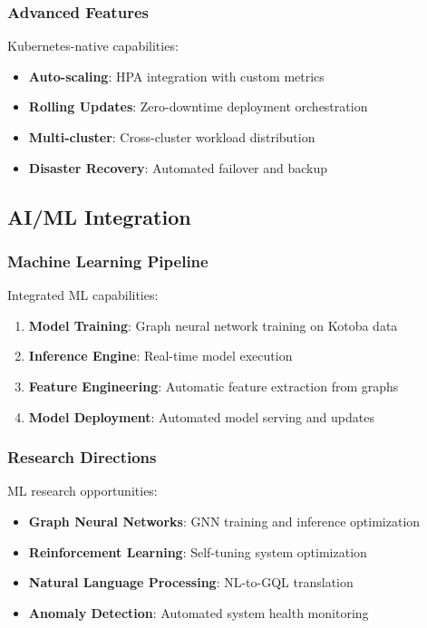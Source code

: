 \documentclass[11pt,a4paper]{article}
\begin{document}
\subsubsection{Advanced Features}
\label{subsubsec:k8s_features}

Kubernetes-native capabilities:

\begin{itemize}
\item \textbf{Auto-scaling}: HPA integration with custom metrics
\item \textbf{Rolling Updates}: Zero-downtime deployment orchestration
\item \textbf{Multi-cluster}: Cross-cluster workload distribution
\item \textbf{Disaster Recovery}: Automated failover and backup
\end{itemize}

\subsection{AI/ML Integration}
\label{subsec:ai_integration}

\subsubsection{Machine Learning Pipeline}
\label{subsubsec:ml_pipeline}

Integrated ML capabilities:

\begin{enumerate}
\item \textbf{Model Training}: Graph neural network training on Kotoba data
\item \textbf{Inference Engine}: Real-time model execution
\item \textbf{Feature Engineering}: Automatic feature extraction from graphs
\item \textbf{Model Deployment}: Automated model serving and updates
\end{enumerate}

\subsubsection{Research Directions}
\label{subsubsec:ml_research}

ML research opportunities:

\begin{itemize}
\item \textbf{Graph Neural Networks}: GNN training and inference optimization
\item \textbf{Reinforcement Learning}: Self-tuning system optimization
\item \textbf{Natural Language Processing}: NL-to-GQL translation
\item \textbf{Anomaly Detection}: Automated system health monitoring
\end{itemize}
\end{document}
